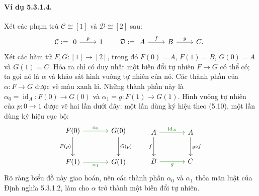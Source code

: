 \paragraph{Ví dụ 5.3.1.4.} Xét các phạm trù $\mathcal C\cong[1]$ và $\mathcal D\cong[2]$ sau:
\[\mathcal C:=\begin{tikzcd}0\arrow[r,"p"]&1\end{tikzcd}\qquad\mathcal D:=\begin{tikzcd}A\arrow[r,"f"]&B\arrow[r,"g"]&C.\end{tikzcd}\]
Xét các hàm tử $F,G:[1]\to[2]$, trong đó $F(0)=A$, $F(1)=B$, $G(0)=A$ và $G(1)=C$. Hóa ra chỉ có duy nhất một biến đổi tự nhiên $F\to G$ có thể có; ta gọi nó là $\alpha$ và khảo sát hình vuông tự nhiên của nó. Các thành phần của $\alpha:F\to G$ được vẽ màu xanh lá. Những thành phần này là $\alpha_0=\operatorname{id}_A:F(0)\to G(0)$ và $\alpha_1=g:F(1)\to G(1)$. Hình vuông tự nhiên của $p:0\to1$ được vẽ hai lần dưới đây: một lần dùng ký hiệu theo (5.10), một lần dùng ký hiệu cục bộ:
\[\begin{tikzcd}[column sep=large,row sep=large]
F(0)\arrow[r,green!45!black,"\alpha_0"]\arrow[d,"F(p)"']&G(0)\arrow[d,"G(p)"]\\
F(1)\arrow[r,green!45!black,"\alpha_1"']&G(1)
\end{tikzcd}\qquad\begin{tikzcd}[column sep=large,row sep=large]
A\arrow[r,green!45!black,"\operatorname{id}_A"]\arrow[d,"f"']&A\arrow[d,"g\circ f"]\\
B\arrow[r,green!45!black,"g"']&C
\end{tikzcd}\]
Rõ ràng biểu đồ này giao hoán, nên các thành phần $\alpha_0$ và $\alpha_1$ thỏa mãn luật của Định nghĩa 5.3.1.2, làm cho $\alpha$ trở thành một biến đổi tự nhiên.
